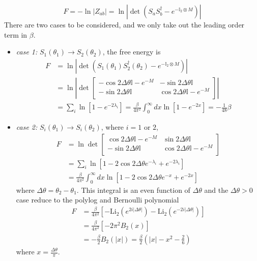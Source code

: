 \begin{equation}
F = - \ln |Z_{ab}| = \ln |\det ( S_a S_b^{\dagger} - e^{- \mathbb{I}_2 \otimes M} )|
\end{equation}
There are two cases to be considered, and we only take out the leading order term in $\beta$. 
\begin{itemize}
\item {\it case 1: }$S_1( \theta_1 ) \rightarrow S_2 ( \theta_2 ) $, the free energy is
\begin{equation}
\begin{aligned}
F & = \ln |\det ( S_1( \theta_1 )  S_2^{\dagger}( \theta_2 )  - e^{- \mathbb{I}_2 \otimes M} )| \\
  & = \ln \left| \det
\begin{bmatrix}
-\cos 2 \Delta \theta \mathbb{I} - e^{-M}   & -\sin 2 \Delta \theta \mathbb{I}\\
- \sin 2\Delta \theta \mathbb{I}  &   \cos 2 \Delta \theta \mathbb{I} - e^{-M} \\ 
\end{bmatrix} \right| \\
& = \sum_i \ln [ 1 -  e^{- 2 \lambda_i }  ] = \frac{\beta}{4\pi^2} \int_0^{\infty} dx \ln [ 1 - e^{-2x} ]  = - \frac{1}{48 }\beta 
\end{aligned}
\end{equation}
\item {\it case 2:} $S_i( \theta_1 ) \rightarrow S_i( \theta_2 )$, where $i = 1 $ or $ 2$, 
\begin{equation}
\begin{aligned}
F & = \ln \det 
\begin{bmatrix}
\cos 2 \Delta \theta \mathbb{I} - e^{-M}   & \sin 2 \Delta \theta \mathbb{I}\\
- \sin 2\Delta \theta \mathbb{I}  &   \cos 2 \Delta \theta \mathbb{I} - e^{-M} \\ 
\end{bmatrix} \\
& = \sum_i \ln [ 1 - 2 \cos 2 \Delta \theta e^{- \lambda_i } + e^{- 2 \lambda_i }  ] \\
& = \frac{\beta}{4\pi^2} \int_0^{\infty} dx \ln [ 1 - 2 \cos 2 \Delta \theta e^{-x} + e^{-2x} ] 
\end{aligned}
\end{equation}
where $\Delta \theta = \theta_2 - \theta_1$. This integral is an even function of $\Delta \theta$ and the $\Delta \theta > 0$ case reduce to the polylog and Bernoulli polynomial
\begin{equation}
\begin{aligned}
  F &= \frac{\beta}{4\pi^2} \left[ - \text{Li}_2 ( e^{2i |\Delta \theta|} ) - \text{Li}_2 ( e^{- 2i |\Delta \theta|} ) \right] \\
  & = \frac{\beta}{4\pi^2}  \left[ - 2\pi^2 B_2 (x) \right] \\
  &= - \frac{\beta}{2} B_2( |x| )  = \frac{\beta}{2} (| x| - x^2 - \frac{2}{6} )
\end{aligned}
\end{equation}
where $x = \frac{\Delta \theta}{ \pi}$. 
\end{itemize}




